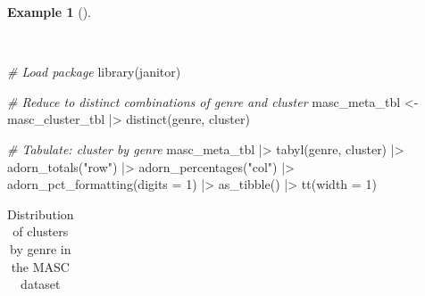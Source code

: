 \documentclass[
  letterpaper,
]{latex/krantz}
\newenvironment{Shaded}{\begin{snugshade}}{\end{snugshade}}
\newcommand{\AttributeTok}[1]{\textcolor[rgb]{0.00,0.00,0.00}{#1}}
\newcommand{\CommentTok}[1]{\textcolor[rgb]{0.00,0.00,0.00}{\textit{#1}}}
\newcommand{\DecValTok}[1]{\textcolor[rgb]{0.00,0.00,0.00}{#1}}
\newcommand{\FunctionTok}[1]{\textcolor[rgb]{0.00,0.00,0.00}{#1}}
\newcommand{\NormalTok}[1]{\textcolor[rgb]{0.00,0.00,0.00}{#1}}
\newcommand{\OtherTok}[1]{\textcolor[rgb]{0.00,0.00,0.00}{#1}}
\newcommand{\SpecialCharTok}[1]{\textcolor[rgb]{0.00,0.00,0.00}{#1}}
\newcommand{\StringTok}[1]{\textcolor[rgb]{0.00,0.00,0.00}{#1}}
\theoremstyle{definition}
\newtheorem{example}{Example}[chapter]
\theoremstyle{remark}
\begin{document}
\begin{example}[]\protect\hypertarget{exm-explore-masc-pos-kmeans-genre}{}\label{exm-explore-masc-pos-kmeans-genre}

~

\begin{Shaded}
\begin{Highlighting}[]
\CommentTok{\# Load package}
\FunctionTok{library}\NormalTok{(janitor)}

\CommentTok{\# Reduce to distinct combinations of genre and cluster}
\NormalTok{masc\_meta\_tbl }\OtherTok{\textless{}{-}}
\NormalTok{  masc\_cluster\_tbl }\SpecialCharTok{|\textgreater{}}
  \FunctionTok{distinct}\NormalTok{(genre, cluster)}

\CommentTok{\# Tabulate: cluster by genre}
\NormalTok{masc\_meta\_tbl }\SpecialCharTok{|\textgreater{}}
  \FunctionTok{tabyl}\NormalTok{(genre, cluster) }\SpecialCharTok{|\textgreater{}}
  \FunctionTok{adorn\_totals}\NormalTok{(}\StringTok{"row"}\NormalTok{) }\SpecialCharTok{|\textgreater{}}
  \FunctionTok{adorn\_percentages}\NormalTok{(}\StringTok{"col"}\NormalTok{) }\SpecialCharTok{|\textgreater{}}
  \FunctionTok{adorn\_pct\_formatting}\NormalTok{(}\AttributeTok{digits =} \DecValTok{1}\NormalTok{) }\SpecialCharTok{|\textgreater{}}
  \FunctionTok{as\_tibble}\NormalTok{() }\SpecialCharTok{|\textgreater{}}
  \FunctionTok{tt}\NormalTok{(}\AttributeTok{width =} \DecValTok{1}\NormalTok{)}
\end{Highlighting}
\end{Shaded}

\begin{longtable}[]{@{}
  >{\raggedright\arraybackslash}p{}
  >{\raggedright\arraybackslash}p{}
  >{\raggedright\arraybackslash}p{}
  >{\raggedright\arraybackslash}p{}
  >{\raggedright\arraybackslash}p{}@{}}

\caption{\label{tbl-explore-masc-pos-kmeans-genre}Distribution of
clusters by genre in the MASC dataset}

\tabularnewline


\end{longtable}
\end{example}
\end{document}
